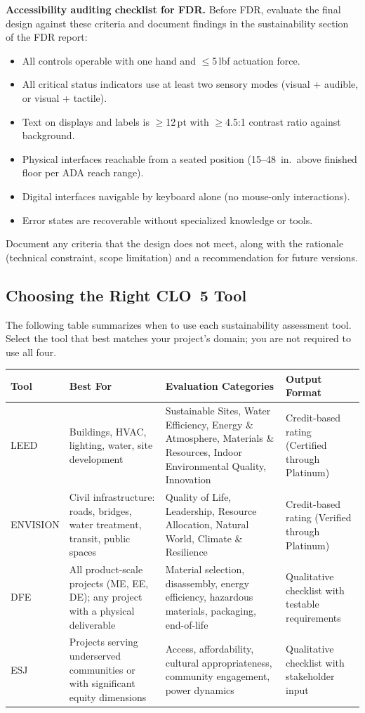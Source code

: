 \textbf{Accessibility auditing checklist for FDR.} Before FDR, evaluate the final design against these criteria and document findings in the sustainability section of the FDR report:
\begin{itemize}[nosep,leftmargin=1.5em]
\item All controls operable with one hand and $\leq$5\,lbf actuation force.
\item All critical status indicators use at least two sensory modes (visual + audible, or visual + tactile).
\item Text on displays and labels is $\geq$12\,pt with $\geq$4.5:1 contrast ratio against background.
\item Physical interfaces reachable from a seated position (15--48~in.\ above finished floor per ADA reach range).
\item Digital interfaces navigable by keyboard alone (no mouse-only interactions).
\item Error states are recoverable without specialized knowledge or tools.
\end{itemize}
Document any criteria that the design does not meet, along with the rationale (technical constraint, scope limitation) and a recommendation for future versions.

\subsection{Choosing the Right CLO~5 Tool}
The following table summarizes when to use each sustainability assessment tool. Select the tool that best matches your project's domain; you are not required to use all four.

\begin{center}\small
\begin{tabularx}{\textwidth}{l>{\raggedright\arraybackslash}p{3cm}>{\raggedright\arraybackslash}X>{\raggedright\arraybackslash}p{3.2cm}}
\toprule
\textbf{Tool} & \textbf{Best For} & \textbf{Evaluation Categories} & \textbf{Output Format} \\
\midrule
LEED & Buildings, HVAC, lighting, water, site development & Sustainable Sites, Water Efficiency, Energy \& Atmosphere, Materials \& Resources, Indoor Environmental Quality, Innovation & Credit-based rating (Certified through Platinum) \\[6pt]
ENVISION & Civil infrastructure: roads, bridges, water treatment, transit, public spaces & Quality of Life, Leadership, Resource Allocation, Natural World, Climate \& Resilience & Credit-based rating (Verified through Platinum) \\[6pt]
DFE & All product-scale projects (ME, EE, DE); any project with a physical deliverable & Material selection, disassembly, energy efficiency, hazardous materials, packaging, end-of-life & Qualitative checklist with testable requirements \\[6pt]
ESJ & Projects serving underserved communities or with significant equity dimensions & Access, affordability, cultural appropriateness, community engagement, power dynamics & Qualitative checklist with stakeholder input \\
\bottomrule
\end{tabularx}
\end{center}

